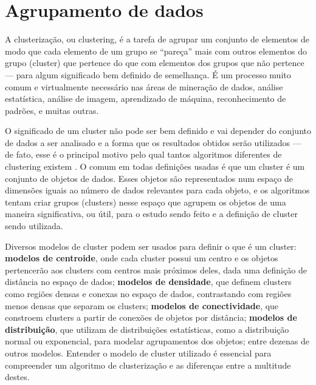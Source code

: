 \documentclass[12pt, %
openright, 
oneside, %
a4paper,    %
brazil]{facom-ufu-abntex2}
\begin{document}

\section{Agrupamento de dados}

A clusterização, ou clustering, é a tarefa de agrupar um conjunto de elementos de modo que cada elemento de um grupo se \enquote{pareça} mais com outros elementos do grupo (cluster) que pertence do que com elementos dos grupos que não pertence --- para algum significado bem definido de semelhança. É um processo muito comum e virtualmente necessário nas áreas de mineração de dados, análise estatística, análise de imagem, aprendizado de máquina, reconhecimento de padrões, e muitas outras.

O significado de um cluster não pode ser bem definido e vai depender do conjunto de dados a ser analisado e a forma que os resultados obtidos serão utilizados --- de fato, esse é o principal motivo pelo qual tantos algoritmos diferentes de clustering existem \cite{SoManyClustAlg}. O comum em todas definições usadas é que um cluster é um conjunto de objetos de dados. Esses objetos são representados num espaço de dimensões iguais ao número de dados relevantes para cada objeto, e os algoritmos tentam criar grupos (clusters) nesse espaço que agrupem os objetos de uma maneira significativa, ou útil, para o estudo sendo feito e a definição de cluster sendo utilizada.



Diversos modelos de cluster podem ser usados para definir o que é um cluster: \textbf{modelos de centroide}, onde cada cluster possui um centro e os objetos pertencerão aos clusters com centros mais próximos deles, dada uma definição de distância no espaço de dados; \textbf{modelos de densidade}, que definem clusters como regiões densas e conexas no espaço de dados, contrastando com regiões menos densas que separam os clusters; \textbf{modelos de conectividade}, que constroem clusters a partir de conexões de objetos por distância; \textbf{modelos de distribuição}, que utilizam de distribuições estatísticas, como a distribuição normal ou exponencial, para modelar agrupamentos dos objetos; entre dezenas de outros modelos. Entender o modelo de cluster utilizado é essencial para compreender um algoritmo de clusterização e as diferenças entre a multitude destes.
\end{document}
